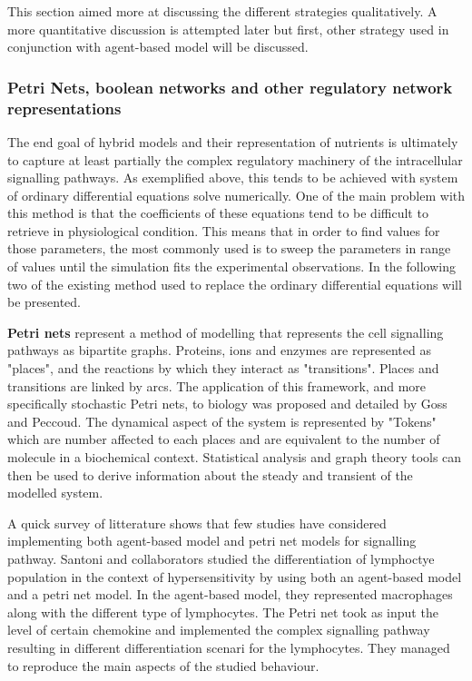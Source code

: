 \documentclass[11pt,a4paper]{article}
\begin{document}
This section aimed more at discussing the different strategies qualitatively. A more quantitative discussion is attempted later but first, other strategy used in conjunction with agent-based model will be discussed.

\subsubsection{Petri Nets, boolean networks and other regulatory network representations}
The end goal of hybrid models and their representation of nutrients is ultimately to capture at least partially the complex regulatory machinery of the intracellular signalling pathways. As exemplified above, this tends to be achieved with system of ordinary differential equations solve numerically. One of the main problem with this method is that the coefficients of these equations tend to be difficult to retrieve in physiological condition. This means that in order to find values for those parameters, the most commonly used is to sweep the parameters in range of values until the simulation fits the experimental observations. In the following two of the existing method used to replace the ordinary differential equations will be presented.

\textbf{Petri nets} represent a method of modelling that represents the cell signalling pathways as bipartite graphs. Proteins, ions and enzymes are represented as "places", and the reactions by which they interact as "transitions". Places and transitions are linked by arcs. The application of this framework, and more specifically stochastic Petri nets, to biology was proposed and detailed by Goss and Peccoud.\cite{Goss1998} The dynamical aspect of the system is represented by "Tokens" which are number affected to each places and are equivalent to the number of molecule in a biochemical context. Statistical analysis and graph theory tools can then be used to derive information about the steady and transient of the modelled system.

A quick survey of litterature shows that few studies have considered implementing both agent-based model and petri net models for signalling pathway. Santoni and collaborators studied the differentiation of lymphoctye population in the context of hypersensitivity by using both an agent-based model and a petri net model.\cite{Santoni2008} In the agent-based model, they represented macrophages along with the different type of lymphocytes. The Petri net took as input the level of certain chemokine and implemented the complex signalling pathway resulting in different differentiation scenari for the lymphocytes. They managed to reproduce the main aspects of the studied behaviour.  %
\end{document}
